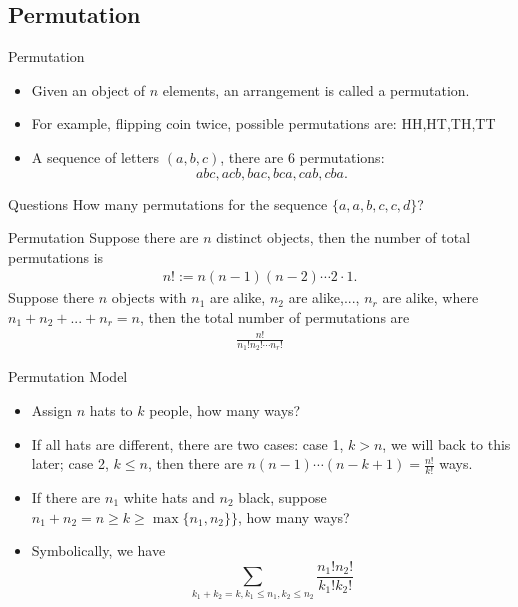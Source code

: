 \subsection{Permutation}
\begin{frame}{Permutation}
    \begin{itemize}
        \item Given an object of $n$ elements, an arrangement is called a permutation.
        \item For example, flipping coin twice, possible permutations are: HH,HT,TH,TT
        \item A sequence of letters $(a,b,c)$, there are 6 permutations: $$abc,acb,bac,bca,cab,cba.$$
    \end{itemize}
    \begin{block}{Questions}
    How many permutations for the sequence $\{a,a,b,c,c,d\}$? 
    \end{block}

\end{frame}
\begin{frame}{Permutation}
\label{permuation theorem}
Suppose there are $n$ distinct objects, then the number of total permutations is 
\begin{align}
    n!:=n(n-1)(n-2)\cdots 2\cdot 1.
\end{align}
\et
{}
\label{gen permuation thm}
Suppose there $n$ objects with $n_1$ are alike, $n_2$ are alike,..., $n_r$ are alike, where $n_1+n_2+...+n_r=n$, then the total number of permutations are 
\begin{align}
    \frac{n!}{n_1!n_2!\cdots n_r!}
\end{align}
\et
    
\end{frame}
\begin{frame}{Permutation Model}
	\begin{itemize}
		\item Assign $n$ hats to $k$ people, how many ways?\pause
		\item If all hats are different, there are two cases: case 1, $k>n$, we will back to this later; case 2, $k\leq n$, then there are $n(n-1)\cdots (n-k+1)=\frac{n!}{k!}$ ways.
		\pause
		\item If there are $n_1$ white hats and $n_2$ black, suppose $n_1+n_2=n\geq k\geq \max\{n_1,n_2\}\}$, how many ways?
		\pause
		\item {}  Symbolically, we have
		\[\sum_{k_1+k_2=k,k_1\leq n_1,k_2\leq n_2}\frac{n_1!n_2!}{k_1!k_2!}\]
	\end{itemize}
\end{frame}

